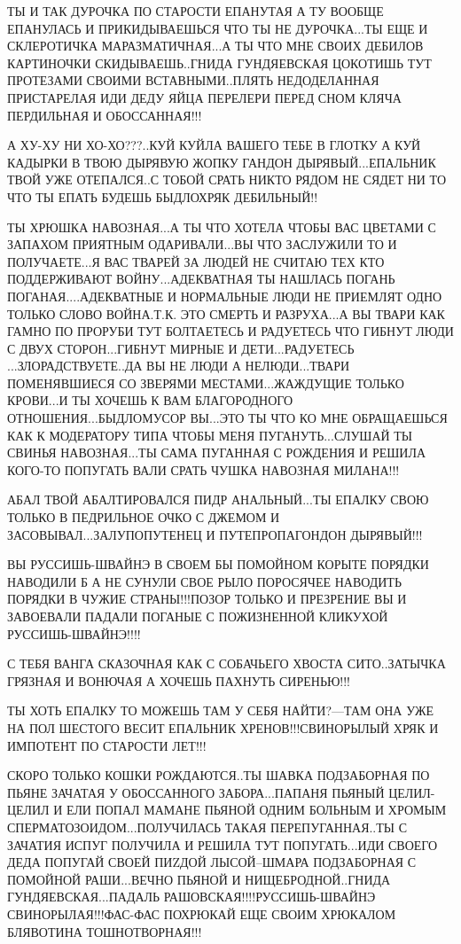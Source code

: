 ТЫ И ТАК ДУРОЧКА ПО СТАРОСТИ ЕПАНУТАЯ А ТУ ВООБЩЕ ЕПАНУЛАСЬ И ПРИКИДЫВАЕШЬСЯ
ЧТО ТЫ НЕ ДУРОЧКА...ТЫ ЕЩЕ И СКЛЕРОТИЧКА МАРАЗМАТИЧНАЯ...А ТЫ ЧТО МНЕ СВОИХ
ДЕБИЛОВ КАРТИНОЧКИ СКИДЫВАЕШЬ..ГНИДА ГУНДЯЕВСКАЯ ЦОКОТИШЬ ТУТ ПРОТЕЗАМИ СВОИМИ
ВСТАВНЫМИ..ПЛЯТЬ НЕДОДЕЛАННАЯ ПРИСТАРЕЛАЯ ИДИ ДЕДУ ЯЙЦА ПЕРЕЛЕРИ ПЕРЕД СНОМ
КЛЯЧА ПЕРДИЛЬНАЯ И ОБОССАННАЯ!!! 

А ХУ-ХУ НИ ХО-ХО???..КУЙ КУЙЛА ВАШЕГО ТЕБЕ В ГЛОТКУ А КУЙ КАДЫРКИ В ТВОЮ
ДЫРЯВУЮ ЖОПКУ ГАНДОН ДЫРЯВЫЙ...ЕПАЛЬНИК ТВОЙ УЖЕ ОТЕПАЛСЯ..С ТОБОЙ СРАТЬ НИКТО
РЯДОМ НЕ СЯДЕТ НИ ТО ЧТО ТЫ ЕПАТЬ БУДЕШЬ БЫДЛОХРЯК ДЕБИЛЬНЫЙ!!       

ТЫ ХРЮШКА НАВОЗНАЯ...А ТЫ ЧТО ХОТЕЛА ЧТОБЫ ВАС ЦВЕТАМИ С ЗАПАХОМ ПРИЯТНЫМ
ОДАРИВАЛИ...ВЫ ЧТО ЗАСЛУЖИЛИ ТО И ПОЛУЧАЕТЕ...Я ВАС ТВАРЕЙ ЗА ЛЮДЕЙ НЕ СЧИТАЮ
ТЕХ КТО ПОДДЕРЖИВАЮТ ВОЙНУ...АДЕКВАТНАЯ ТЫ НАШЛАСЬ ПОГАНЬ ПОГАНАЯ....АДЕКВАТНЫЕ
И НОРМАЛЬНЫЕ ЛЮДИ НЕ ПРИЕМЛЯТ ОДНО ТОЛЬКО СЛОВО ВОЙНА.Т.К. ЭТО СМЕРТЬ И
РАЗРУХА...А ВЫ ТВАРИ КАК ГАМНО ПО ПРОРУБИ ТУТ БОЛТАЕТЕСЬ И  РАДУЕТЕСЬ ЧТО
ГИБНУТ ЛЮДИ С ДВУХ СТОРОН...ГИБНУТ МИРНЫЕ И ДЕТИ...РАДУЕТЕСЬ
...ЗЛОРАДСТВУЕТЕ..ДА ВЫ НЕ ЛЮДИ А НЕЛЮДИ...ТВАРИ ПОМЕНЯВШИЕСЯ СО ЗВЕРЯМИ
МЕСТАМИ...ЖАЖДУЩИЕ ТОЛЬКО КРОВИ...И ТЫ ХОЧЕШЬ К ВАМ БЛАГОРОДНОГО
ОТНОШЕНИЯ...БЫДЛОМУСОР ВЫ...ЭТО ТЫ ЧТО КО МНЕ ОБРАЩАЕШЬСЯ КАК К МОДЕРАТОРУ ТИПА
ЧТОБЫ МЕНЯ ПУГАНУТЬ...СЛУШАЙ ТЫ СВИНЬЯ НАВОЗНАЯ...ТЫ САМА ПУГАННАЯ С РОЖДЕНИЯ И
РЕШИЛА КОГО-ТО ПОПУГАТЬ ВАЛИ СРАТЬ ЧУШКА НАВОЗНАЯ МИЛАНА!!!    

АБАЛ ТВОЙ АБАЛТИРОВАЛСЯ ПИДР АНАЛЬНЫЙ...ТЫ ЕПАЛКУ СВОЮ ТОЛЬКО В ПЕДРИЛЬНОЕ ОЧКО
С ДЖЕМОМ И ЗАСОВЫВАЛ...ЗАЛУПОПУТЕНЕЦ И ПУТЕПРОПАГОНДОН ДЫРЯВЫЙ!!!      

ВЫ РУССИШЬ-ШВАЙНЭ В СВОЕМ БЫ ПОМОЙНОМ КОРЫТЕ ПОРЯДКИ НАВОДИЛИ Б А НЕ СУНУЛИ
СВОЕ РЫЛО ПОРОСЯЧЕЕ НАВОДИТЬ ПОРЯДКИ В ЧУЖИЕ СТРАНЫ!!!ПОЗОР ТОЛЬКО И ПРЕЗРЕНИЕ
ВЫ И ЗАВОЕВАЛИ ПАДАЛИ ПОГАНЫЕ С ПОЖИЗНЕННОЙ КЛИКУХОЙ  РУССИШЬ-ШВАЙНЭ!!!!    

С ТЕБЯ ВАНГА СКАЗОЧНАЯ КАК С СОБАЧЬЕГО ХВОСТА СИТО..ЗАТЫЧКА ГРЯЗНАЯ И ВОНЮЧАЯ А
ХОЧЕШЬ ПАХНУТЬ СИРЕНЬЮ!!!   

ТЫ ХОТЬ ЕПАЛКУ ТО МОЖЕШЬ ТАМ У СЕБЯ НАЙТИ?---ТАМ ОНА УЖЕ НА ПОЛ ШЕСТОГО ВЕСИТ
ЕПАЛЬНИК ХРЕНОВ!!!СВИНОРЫЛЫЙ ХРЯК И ИМПОТЕНТ ПО СТАРОСТИ ЛЕТ!!!               

СКОРО ТОЛЬКО КОШКИ РОЖДАЮТСЯ..ТЫ ШАВКА ПОДЗАБОРНАЯ ПО ПЬЯНЕ ЗАЧАТАЯ У
ОБОССАННОГО ЗАБОРА...ПАПАНЯ ПЬЯНЫЙ ЦЕЛИЛ-ЦЕЛИЛ И ЕЛИ ПОПАЛ МАМАНЕ ПЬЯНОЙ ОДНИМ
БОЛЬНЫМ И ХРОМЫМ СПЕРМАТОЗОИДОМ...ПОЛУЧИЛАСЬ ТАКАЯ ПЕРЕПУГАННАЯ..ТЫ С ЗАЧАТИЯ
ИСПУГ ПОЛУЧИЛА И РЕШИЛА ТУТ ПОПУГАТЬ...ИДИ СВОЕГО ДЕДА ПОПУГАЙ  СВОЕЙ ПИZДОЙ
ЛЫСОЙ--ШМАРА ПОДЗАБОРНАЯ С ПОМОЙНОЙ РАШИ...ВЕЧНО ПЬЯНОЙ И НИЩЕБРОДНОЙ..ГНИДА
ГУНДЯЕВСКАЯ...ПАДАЛЬ РАШОВСКАЯ!!!!РУССИШЬ-ШВАЙНЭ СВИНОРЫЛАЯ!!!ФАС-ФАС ПОХРЮКАЙ
ЕЩЕ СВОИМ ХРЮКАЛОМ БЛЯВОТИНА ТОШНОТВОРНАЯ!!!                           

